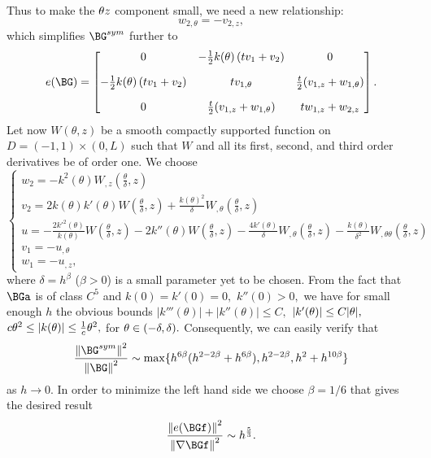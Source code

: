 Thus to make the $\theta z$ component small, we need a new relationship:
\begin{equation}
\label{4.51}
w_{2,\theta}=-v_{2,z},
\end{equation}
which simplifies $\BG^{sym}$ further to
\begin{equation}
\label{4.52}
e(\BG)=
\begin{bmatrix} 
0       &      -\frac{1}{2}k(\theta)\left(tv_1+v_2\right)    &    0 \\[10pt]
-\frac{1}{2}k(\theta)\left(tv_1+v_2\right)    &     tv_{1,\theta}    &      \frac{t}{2}(v_{1,z}+w_{1,\theta})\\[10pt]
0      &    \frac{t}{2}(v_{1,z}+w_{1,\theta})    &      tw_{1,z}+w_{2,z}
\end{bmatrix}.
\end{equation}
Let now $W(\theta,z)$ be a smooth compactly supported function on $D=(-1,1)\times(0,L)$ such that $W$ and all its first, second, and third order derivatives be of order one. 
We choose 
\begin{equation}
\label{4.53}
\begin{cases}
w_2=-k^2(\theta)W_{,z}(\frac{\theta}{\delta},z)\\[5pt]
v_2=2k(\theta)k'(\theta)W(\frac{\theta}{\delta},z)+\frac{k(\theta)^2}{\delta}W_{,\theta}(\frac{\theta}{\delta},z)\\[5pt]
u=-\frac{2k'^2(\theta)}{k(\theta)}W(\frac{\theta}{\delta},z)-2k''(\theta)W(\frac{\theta}{\delta},z)-\frac{4k'(\theta)}{\delta}W_{,\theta}(\frac{\theta}{\delta},z)-\frac{k(\theta)}{\delta^2}W_{,\theta\theta}(\frac{\theta}{\delta},z)\\[5pt]
v_1=-u_{,\theta}\\[5pt]
w_1=-u_{,z},
\end{cases}
\end{equation}
where $\delta=h^\beta$ ($\beta>0$) is a small parameter yet to be chosen. From the fact that $\BGa$ is of class $C^5$ and $k(0)=k'(0)=0,$ $k''(0)>0,$ we have for small enough $h$ the obvious bounds $|k'''(\theta)|+|k''(\theta)|\leq C,$ $|k'(\theta)|\leq C|\theta|,$ $c\theta^2\leq |k(\theta)|\leq \frac{1}{c}\theta^2,$ for $\theta\in (-\delta,\delta).$
Consequently, we can easily verify that
$$
\frac{\norm{\BG^{sym}}^2}{\norm{\BG}^2}\sim \max\{h^{6\beta}(h^{2-2\beta}+h^{6\beta}),h^{2-2\beta},h^2+h^{10\beta}\}
$$
as $h\to 0.$ In order to minimize the left hand side we choose $\beta=1/6$ that gives the desired result
$$\frac{\norm{e(\BGf)}^2}{\norm{\nabla\BGf}^2}\sim h^{\frac{5}{3}}.$$ 







